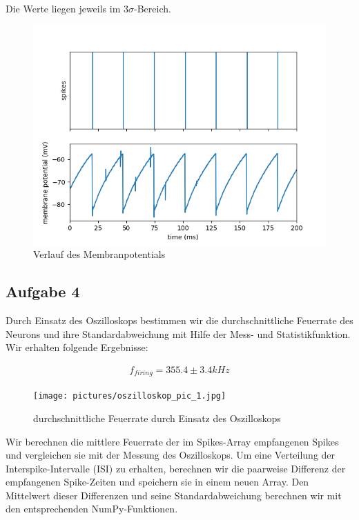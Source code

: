\documentclass[10pt,a4paper]{scrartcl}
\begin{document}
\noindent Die Werte liegen jeweils im $3\sigma$-Bereich.
\begin{figure} [ht]
\begin{center}
\label{fig:abb2}
\caption{Verlauf des Membranpotentials}
\includegraphics[scale=0.5]{experiments/SingleNeuron/fp_task1_1membrane.png} 
\end{center}
\end{figure}


\subsection{Aufgabe 4}
Durch Einsatz des Oszilloskops bestimmen wir die durchschnittliche Feuerrate des Neurons und ihre Standardabweichung mit Hilfe der Mess- und Statistikfunktion. Wir erhalten folgende Ergebnisse: 

\begin{align*}
f_{firing} = 355.4 \pm 3.4 kHz
\end{align*}

\begin{figure} [ht]
\begin{center}
\label{fig:abb3}
\caption{durchschnittliche Feuerrate durch Einsatz des Oszilloskops}
\texttt{[image: pictures/oszilloskop\_pic\_1.jpg]} 
\end{center}
\end{figure}

\noindent Wir berechnen die mittlere Feuerrate der im Spikes-Array empfangenen Spikes und vergleichen sie mit der Messung des Oszilloskops. Um eine Verteilung der Interspike-Intervalle (ISI) zu erhalten, berechnen wir die paarweise Differenz der empfangenen Spike-Zeiten und speichern sie in einem neuen Array. Den
Mittelwert dieser Differenzen und seine Standardabweichung berechnen wir mit den
entsprechenden NumPy-Funktionen.
\end{document}
